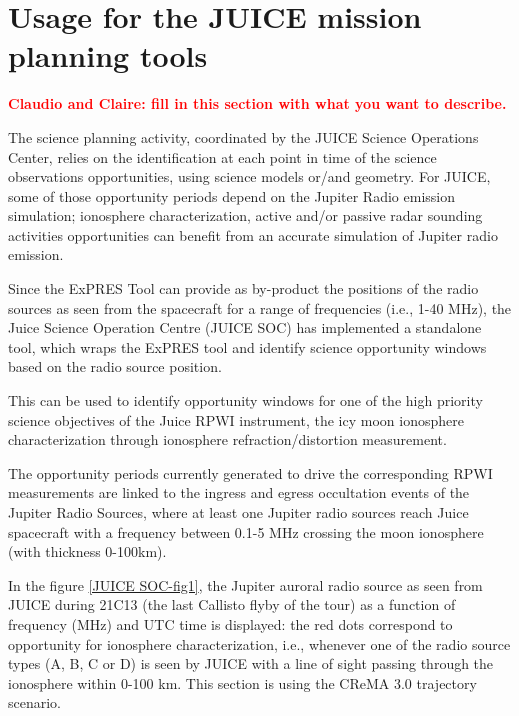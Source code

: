 \documentclass[referee]{aa}
\newcommand{\tbd}[1]{\textcolor{red}{\textbf{#1}}}
\begin{document}
\section{Usage for the JUICE mission planning tools} %

\tbd{Claudio and Claire: fill in this section with what you want to describe.}

The science planning activity, coordinated by the JUICE Science Operations Center, relies on the identification at each point in time of the science observations opportunities, using science models or/and geometry. For JUICE, some of those opportunity periods depend on the Jupiter Radio emission simulation; ionosphere characterization, active and/or passive radar sounding activities opportunities can benefit from an accurate simulation of Jupiter radio emission.

Since the ExPRES Tool can provide as by-product the positions of the radio sources as seen from the spacecraft for a range of frequencies (i.e., 1-40 MHz), the Juice Science Operation Centre (JUICE SOC) has implemented a standalone tool, which wraps the ExPRES tool and identify science opportunity windows based on the radio source position. 

This can be used to identify opportunity windows for one of the high priority science objectives of the Juice RPWI instrument, the icy moon ionosphere characterization through ionosphere refraction/distortion measurement.

The opportunity periods currently generated to drive the corresponding RPWI measurements are linked to the ingress and egress occultation events of the Jupiter Radio Sources, where at least one Jupiter radio sources reach Juice spacecraft with a frequency between 0.1-5 MHz crossing the moon ionosphere (with thickness 0-100km).

In the figure \ref{JUICE SOC-fig1}, the Jupiter auroral radio source as seen from JUICE during 21C13 (the last Callisto flyby of the tour) as a function of frequency (MHz) and UTC time is displayed: the red dots correspond to opportunity for ionosphere characterization, i.e., whenever one of the radio source types (A, B, C or D) is seen by JUICE with a line of sight passing through the ionosphere within 0-100 km. This section is using the CReMA 3.0 trajectory scenario.
\end{document}
